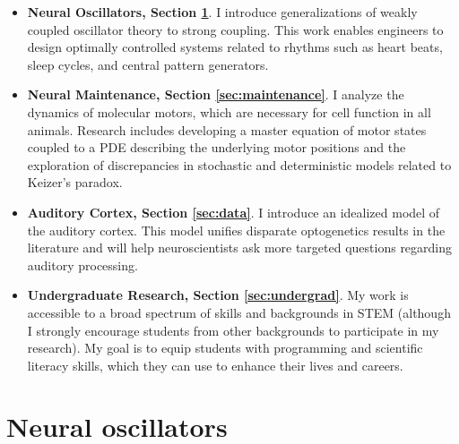 \documentclass[a4paper,11pt]{article}
\begin{document}
	\begin{itemize}
		\item \textbf{Neural Oscillators, Section \ref{sec:interactions}}. I introduce generalizations of weakly coupled oscillator theory to strong coupling. This work enables engineers to design optimally controlled systems related to rhythms such as heart beats, sleep cycles, and central pattern generators.
		\item \textbf{Neural Maintenance, Section \ref{sec:maintenance}}. I analyze the dynamics of molecular motors, which are necessary for cell function in all animals. Research includes developing a master equation of motor states coupled to a PDE describing the underlying motor positions and the exploration of discrepancies in stochastic and deterministic models related to Keizer's paradox.
		\item \textbf{Auditory Cortex, Section \ref{sec:data}}. I introduce an idealized model of the auditory cortex. This model unifies disparate optogenetics results in the literature and will help neuroscientists ask more targeted questions regarding auditory processing.
		\item \textbf{Undergraduate Research, Section \ref{sec:undergrad}}. My work is accessible to a broad spectrum of skills and backgrounds in STEM (although I strongly encourage students from other backgrounds to participate in my research). My goal is to equip students with programming and scientific literacy skills, which they can use to enhance their lives and careers.
	\end{itemize}
	
    \newpage
	\section{Neural oscillators}\label{sec:interactions}
	
	
\end{document}
